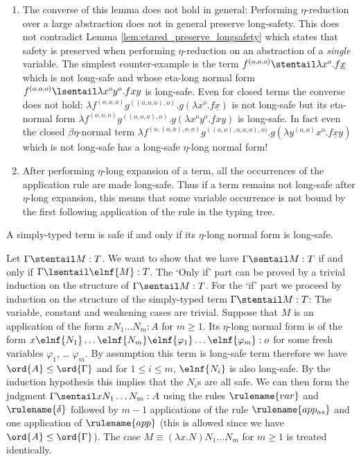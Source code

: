 \begin{remark}\hfill
\begin{enumerate}
\item
The converse of this lemma does not hold in general: Performing
$\eta$-reduction over a large abstraction does not in general
preserve long-safety. This does not contradict Lemma
  \ref{lem:etared_preserve_longsafety} which states that safety is
  preserved when performing $\eta$-reduction on an abstraction
  of a \emph{single} variable. The simplest counter-example is
  the
 term $f^{(o,o,o)} \stentail \lambda x^o . f \underline{x}$ which is not long-safe and
whose eta-long normal form $f^{(o,o,o)} \lsentail \lambda x^o y^o .
f x y$ is long-safe. Even for closed terms the converse does not
hold: $\lambda f^{(o,o,o)} g^{((o,o,o),o)} . g(\lambda x^o . f
\underline{x})$ is not long-safe but its eta-normal form $\lambda f^{(o,o,o)}
g^{((o,o,o),o)} . g(\lambda x^o y^o. f x y)$ is long-safe. In fact
even the closed $\beta\eta$-normal term $\lambda
f^{(o,(o,o),o,o)} g^{((o,o),o,o,o),o)} . g(\lambda y^{(o,o)} x^o
. f \underline{x} y)$ which is not long-safe has a long-safe $\eta$-long normal form!

  \item After performing $\eta$-long expansion of a term, all the occurrences of the application rule are made long-safe. Thus if a term remains not long-safe after $\eta$-long expansion, this means that
  some variable occurrence is not bound by the
  first following application of the  rule in the
  typing tree.
  \end{enumerate}
\end{remark}

\begin{lemma}
  \label{lem:safe_iff_etalong_lsafe}
  A simply-typed term is safe if and only if its $\eta$-long normal form is long-safe.
\end{lemma}
\proof Let $\Gamma \stentail M : T$. We want to show that we have $\Gamma \sentail M : T$ if and only if $\Gamma \lsentail \elnf{M} : T$. The
`Only if' part can be proved by a trivial induction on the structure of
$\Gamma \sentail M : T$. For the `if' part we proceed by
induction on the structure of the simply-typed term $\Gamma
\stentail M : T$: The variable, constant and weakening cases are
trivial. Suppose that $M$ is an application of the form $x N_1
\ldots N_m : A$ for $m\geq 1$. Its $\eta$-long normal form is of the
form $x \elnf{N_1} \ldots \elnf{N_m} \elnf{\varphi_1} \ldots
\elnf{\varphi_m}: o$ for some fresh variables $\varphi_1$, \ldots
$\varphi_m$. By assumption this term is long-safe term therefore we
have $\ord{A}\leq\ord{\Gamma}$ and for $1\leq i \leq m$,
$\elnf{N_i}$ is also long-safe. By the induction hypothesis this
implies that the $N_i$s are all safe. We can then form the judgment
$\Gamma \sentail x N_1 \ldots N_m : A$ using the rules
$\rulename{var}$ and $\rulename{\delta}$ followed by $m-1$
applications of the rule $\rulename{app_{as}}$ and one application
of $\rulename{app}$ (this is allowed since we have
$\ord{A}\leq\ord{\Gamma}$). The case $M\equiv (\lambda x. N) N_1
\ldots N_m$ for $m\geq 1$ is treated identically.

